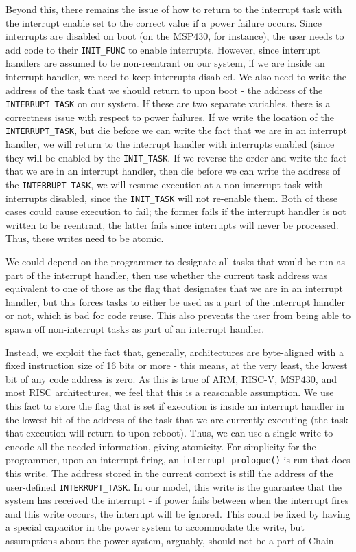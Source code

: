 \documentclass[11pt]{sensys-proc}
\newcommand{\chain}{Chain\xspace}
\begin{document}
Beyond this, there remains the issue of how to return to the interrupt task
with the interrupt enable set to the correct value if a power failure occurs.
Since interrupts are disabled on boot (on the MSP430, for instance), the user
needs to add code to their \texttt{INIT\_FUNC} to enable interrupts. However,
since interrupt handlers are assumed to be non-reentrant on our system, if
we are inside an interrupt handler, we need to keep interrupts disabled. We
also need to write the address of the task that we should return to upon boot -
the address of the \texttt{INTERRUPT\_TASK} on our system. If these are two
separate variables, there is a correctness issue with respect to power
failures. If we write the location of the \texttt{INTERRUPT\_TASK}, but die
before we can write the fact that we are in an interrupt handler, we will
return to the interrupt handler with interrupts enabled (since they will be
enabled by the \texttt{INIT\_TASK}. If we reverse the order and write the fact
that we are in an interrupt handler, then die before we can write the address
of the \texttt{INTERRUPT\_TASK}, we will resume execution at a non-interrupt
task with interrupts disabled, since the \texttt{INIT\_TASK} will not re-enable
them. Both of these cases could cause execution to fail; the former fails if
the interrupt handler is not written to be reentrant, the latter fails since
interrupts will never be processed. Thus, these writes need to be atomic.


We could depend on the programmer to designate all tasks that would be run as
part of the interrupt handler, then use whether the current task address was
equivalent to one of those as the flag that designates that we are in an
interrupt handler, but this forces tasks to either be used as a part of the
interrupt handler or not, which is bad for code reuse. This also prevents the
user from being able to spawn off non-interrupt tasks as part of an interrupt
handler.


Instead, we exploit the fact that, generally, architectures are byte-aligned
with a fixed instruction size of 16 bits or more - this means, at the very
least, the lowest bit of any code address is zero. As this is true of ARM,
RISC-V, MSP430, and most RISC architectures, we feel that this is a reasonable
assumption. We use this fact to store the flag that is set if execution is
inside an interrupt handler in the lowest bit of the address of the task that
we are currently executing (the task that execution will return to upon
reboot). Thus, we can use a single write to encode all the needed information,
giving atomicity. For simplicity for the programmer, upon an interrupt firing,
an \texttt{interrupt\_prologue()} is run that does this write. The address stored
in the current context is still the address of the user-defined
\texttt{INTERRUPT\_TASK}. In our model, this write is the guarantee that the
system has received the interrupt - if power fails between when the interrupt
fires and this write occurs, the interrupt will be ignored. This could be fixed
by having a special capacitor in the power system to accommodate the write, but
assumptions about the power system, arguably, should not be a part of \chain.
\end{document}
